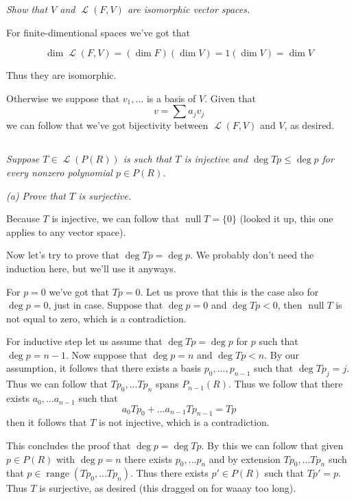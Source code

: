 \documentclass[11pt,oneside,titlepage]{book}
\DeclareMathOperator \map {\mathcal {L}}
\DeclareMathOperator \ns {null}
\DeclareMathOperator \range {range}
\begin{document}
\textit{Show that $V$ and $\map(F, V)$ are isomorphic vector spaces.}

For finite-dimentional spaces we've got that

$$\dim \map (F, V) = (\dim F)(\dim V) = 1 (\dim V) = \dim V$$

Thus they are isomorphic.

Otherwise we suppose that $v_1, ...$ is a basis of $V$. Given that
$$v = \sum a_j v_j$$
we can follow that we've got bijectivity between $\map(F, V)$ and $V$, as desired.

\subsection{}

\textit{Suppose $T \in \map(P(R))$ is such that $T$ is injective and $\deg Tp \leq \deg p$
  for every nonzero polynomial $p \in P(R)$.}

\textit{(a) Prove that $T$ is surjective.}

Because $T$ is injective, we can follow that $\ns T = \{0\}$ (looked it up, this one applies
to any vector space).

Now let's try to prove that $\deg Tp = \deg p$.
We probably don't need the induction here, but we'll use it anyways.

For $p = 0$ we've got that $Tp = 0$. Let us prove that this is the case also
for $\deg p = 0$, just in case. Suppose that $\deg p = 0$ and $\deg Tp < 0$, then $\ns T$ is
not equal to zero, which is a contradiction.

For inductive step let us assume that $\deg Tp = \deg p$ for $p$ such that  $\deg p = n - 1$.
Now suppose that $\deg p = n$ and $\deg Tp < n$. By our assumption,  it follows that there exists
a basis $p_0, ..., p_{n - 1}$ such that $\deg T p_j = j$. Thus we can follow that $T p_0, ... T p_n$
spans $P_{n - 1}(R)$. Thus we follow that there exists $a_0, ... a_{n - 1}$ such that
$$a_0 T p_0 + ... a_{n - 1} T p_{n - 1} = T p$$
then it follows that $T$ is not injective, which is a contradiction.

This concludes the proof that $\deg p = \deg Tp$. By this we can follow that
given $p \in P(R)$ with $\deg p = n$ there exists $p_0, ... p_n$ and by extension
$T p_0, ... Tp_n$ such that $p \in \range(T p_0, ... Tp_n)$. Thus there exists
$p' \in P(R)$ such that $Tp' = p$. Thus $T$ is surjective, as desired (this dragged
on for waaay too long).

\subsection{}
\end{document}
